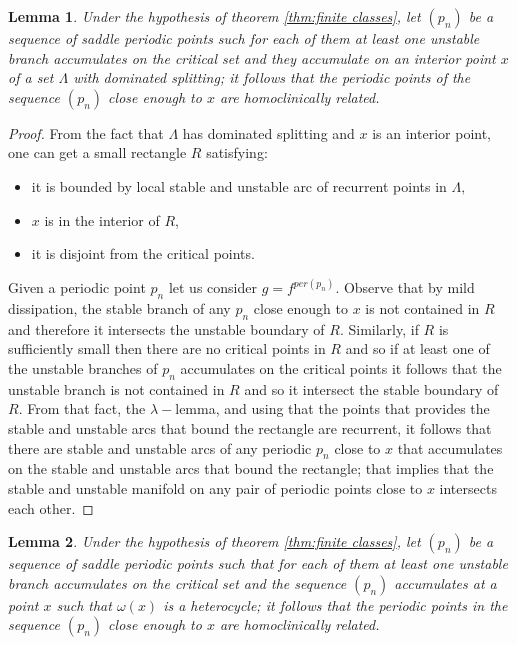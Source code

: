 \documentclass[a4paper,11pt]{article}
\newtheorem{lemma}{Lemma}
\theoremstyle{definition}
\def\La{\Lambda}
\def\la{\lambda}
\def\La{\Lambda}
\begin{document}
    


\begin{lemma}\label{interior} Under the hypothesis of theorem \ref{thm:finite classes}, let $(p_n)$ be  a sequence of saddle periodic points such for  each of them at least one unstable branch accumulates on the critical set and they accumulate on an interior point $x$ of a   set $\La$ with dominated splitting; it follows  that the periodic points of the sequence $(p_n)$ close enough to $x$  are homoclinically related. 

\end{lemma}

 \begin{proof}

From the fact that $\La$ has dominated splitting and $x$ is an interior point,  
one can get a small rectangle $R$   satisfying: 

\begin{itemize}
    \item[--]  it is bounded by local stable and unstable arc of recurrent points in $\La,$
    \item[--] $x$ is in the interior of $R$,
    \item[--] it is disjoint from the  critical points.

    
\end{itemize}

Given a periodic point $p_n$ let us consider $g=f^{per(p_n)}$. Observe that by mild dissipation, the stable branch of any $p_n$ close enough to $x$ is not contained in $R$ and therefore it intersects the unstable boundary of $R.$  Similarly, if $R$ is sufficiently small then there are no critical points in $R$ and so if at least one of the  unstable branches of $p_n$  accumulates on the critical points it follows  that  the unstable branch is  not contained in $R$ and so  it  intersect the stable boundary of $R.$ From that fact, the $\la-$lemma, and using   that the points that provides the stable and unstable arcs that bound the rectangle are recurrent, it follows that there are   stable and unstable arcs of any periodic $p_n$ close to $x$ that accumulates on the stable and unstable arcs that bound the rectangle; that implies that the stable and unstable manifold on any pair of periodic points close to $x$ intersects each other.

    
\end{proof}

\begin{lemma}\label{HC} Under the hypothesis of theorem \ref{thm:finite classes}, let $(p_n)$ be  a sequence of saddle periodic points such that  for each of them at least one unstable branch accumulates on the critical set and the sequence $(p_n)$ accumulates at a point $x$ such that $\omega(x)$ is a heterocycle; it follows  that the  periodic points in the sequence $(p_n)$ close enough to $x$  are homoclinically related. 

\end{lemma}
\end{document}

